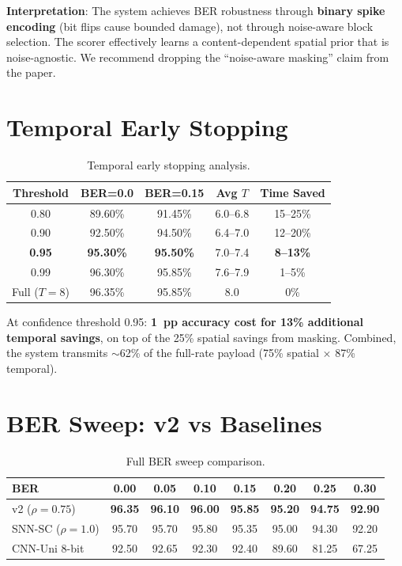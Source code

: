 \documentclass[conference]{IEEEtran}
\begin{document}
\textbf{Interpretation}: The system achieves BER robustness through \textbf{binary spike encoding} (bit flips cause bounded damage), not through noise-aware block selection. The scorer effectively learns a content-dependent spatial prior that is noise-agnostic. We recommend dropping the ``noise-aware masking'' claim from the paper.


\section{Temporal Early Stopping}

\begin{table}[h]
\centering
\caption{Temporal early stopping analysis.}
\begin{tabular}{@{}c c c c c@{}}
\toprule
\textbf{Threshold} & \textbf{BER=0.0} & \textbf{BER=0.15} & \textbf{Avg $T$} & \textbf{Time Saved} \\
\midrule
0.80 & 89.60\% & 91.45\% & 6.0--6.8 & 15--25\% \\
0.90 & 92.50\% & 94.50\% & 6.4--7.0 & 12--20\% \\
\textbf{0.95} & \textbf{95.30\%} & \textbf{95.50\%} & 7.0--7.4 & \textbf{8--13\%} \\
0.99 & 96.30\% & 95.85\% & 7.6--7.9 & 1--5\% \\
Full ($T{=}8$) & 96.35\% & 95.85\% & 8.0 & 0\% \\
\bottomrule
\end{tabular}
\end{table}

At confidence threshold 0.95: \textbf{1~pp accuracy cost for 13\% additional temporal savings}, on top of the 25\% spatial savings from masking. Combined, the system transmits $\sim$62\% of the full-rate payload (75\% spatial $\times$ 87\% temporal).


\section{BER Sweep: v2 vs Baselines}

\begin{table}[h]
\centering
\caption{Full BER sweep comparison.}
\begin{tabular}{@{}l c c c c c c c@{}}
\toprule
\textbf{BER} & 0.00 & 0.05 & 0.10 & 0.15 & 0.20 & 0.25 & 0.30 \\
\midrule
v2 ($\rho{=}0.75$) & \textbf{96.35} & \textbf{96.10} & \textbf{96.00} & \textbf{95.85} & \textbf{95.20} & \textbf{94.75} & \textbf{92.90} \\
SNN-SC ($\rho{=}1.0$) & 95.70 & 95.70 & 95.80 & 95.35 & 95.00 & 94.30 & 92.20 \\
CNN-Uni 8-bit & 92.50 & 92.65 & 92.30 & 92.40 & 89.60 & 81.25 & 67.25 \\
\bottomrule
\end{tabular}
\end{table}
\end{document}
